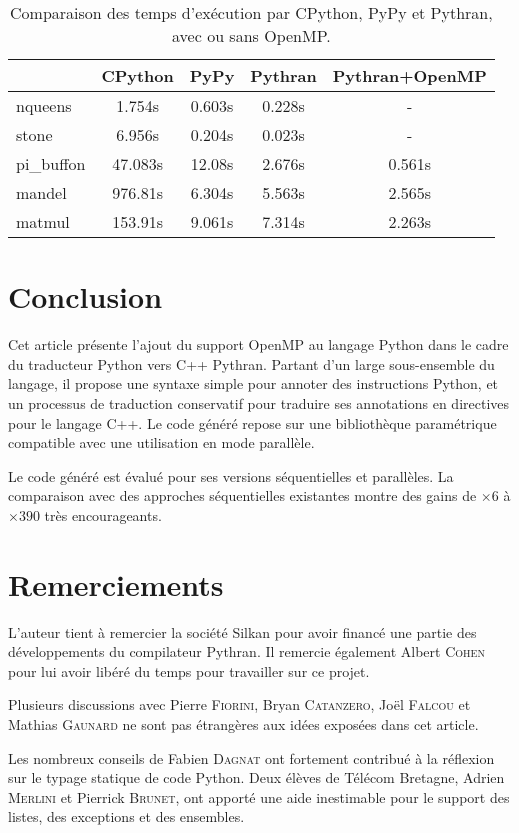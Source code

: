 \documentclass[renpar]{compas2013}
\begin{document}
\begin{table}
	\centering
  \begin{tabular}{l|c|c|c|c}
				&CPython	&	PyPy	&	Pythran	&	Pythran+OpenMP\\
	  \hline
	  \hline
	nqueens		&1.754s		&	0.603s	&	0.228s	&	-		  \\
	stone		&6.956s		&	0.204s	&	0.023s	&	-\\
	pi\_buffon	&47.083s	&	12.08s	&	2.676s	&	0.561s		\\
	mandel		&976.81s	&	6.304s	&	5.563s	&	2.565s\\
	matmul		&153.91s	&	9.061s	&	7.314s	&	2.263s\\
  \end{tabular}

  \caption{Comparaison des temps d'exécution par CPython, PyPy et Pythran, avec ou sans OpenMP.}
  \label{tbl:pythran-vs-cpython}
\end{table}

\section{Conclusion}

Cet article présente l'ajout du support OpenMP au langage Python dans le
cadre du traducteur Python vers C++ Pythran. Partant d'un large
sous-ensemble du langage, il propose une syntaxe simple pour annoter des
instructions Python, et un processus de traduction conservatif pour
traduire ses annotations en directives pour le langage C++. Le code généré
repose sur une bibliothèque paramétrique compatible avec une utilisation
en mode parallèle.

Le code généré est évalué pour ses versions séquentielles et parallèles. La
comparaison avec des approches séquentielles existantes montre des gains
de $\times 6$ à $\times 390$ très encourageants.



\section{Remerciements}

L'auteur tient à remercier la société Silkan pour avoir financé une partie des
développements du compilateur Pythran. Il remercie également Albert
\textsc{Cohen} pour lui avoir libéré du temps pour travailler sur ce projet.

Plusieurs discussions avec Pierre \textsc{Fiorini}, Bryan
\textsc{Catanzero}, Joël \textsc{Falcou} et Mathias \textsc{Gaunard} ne
sont pas étrangères aux idées exposées dans cet article.

Les nombreux conseils de Fabien \textsc{Dagnat} ont fortement contribué à
la réflexion sur le typage statique de code Python. Deux élèves de Télécom
Bretagne, Adrien \textsc{Merlini} et Pierrick \textsc{Brunet}, ont apporté
une aide inestimable pour le support des listes, des exceptions et des
ensembles.


\end{document}
